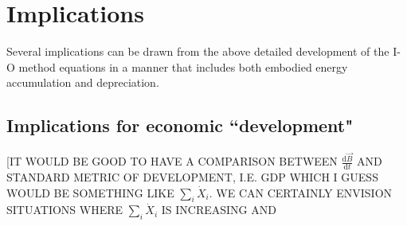 %
%
%
\chapter{Implications}
\label{chap:implications} %





Several implications can be drawn from the above detailed development of the I-O method equations in a manner that includes both embodied energy accumulation and depreciation.

\section{Implications for economic ``development"}

[IT WOULD BE GOOD TO HAVE A COMPARISON BETWEEN $\frac{\mathrm{d}\vec{B}}{\mathrm{d}t}$ AND STANDARD METRIC OF DEVELOPMENT, I.E. GDP WHICH I GUESS WOULD BE SOMETHING LIKE $\sum_{i}\dot{X}_{i}$. WE CAN CERTAINLY ENVISION SITUATIONS WHERE $\sum_{i}\dot{X}_{i}$ IS INCREASING AND 

